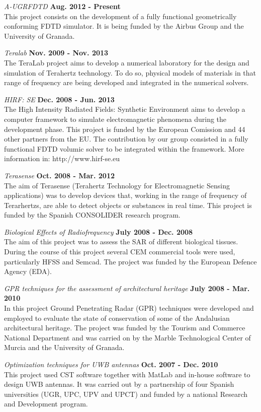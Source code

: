 \documentclass[margin,line]{res}
\begin{document}
\begin{resume}
\begin{minipage}{\textwidth}
  {\em A-UGRFDTD} \hfill {\bf Aug. 2012 - Present}\\
  This project consists on the development of a fully functional geometrically conforming FDTD simulator.
  It is being funded by the Airbus Group and the University of Granada.
\end{minipage}

{\em Teralab} \hfill {\bf Nov. 2009 - Nov. 2013}\\
The TeraLab project aims to develop a numerical laboratory for the design and
simulation of Terahertz technology. To do so, physical models of materials in that
range of frequency are being developed and integrated in the numerical solvers.

{\em HIRF: SE} \hfill {\bf Dec. 2008 - Jun. 2013}\\
The High Intensity Radiated Fields: Synthetic Environment aims to develop a computer framework to simulate electromagnetic phenomena during the development phase. This project is funded by the European Comission and 44 other partners from the EU. The contribution by our group consisted in a fully functional FDTD volumic solver to be integrated within the framework. More information in: http://www.hirf-se.eu

{\em Terasense} \hfill {\bf Oct. 2008 - Mar. 2012}\\
The aim of Terasense (Terahertz Technology for Electromagnetic Sensing
applications) was to develop devices that, working in the range of frequency of
Terarhertzs, are able to detect objects or substances in real time. This project is
funded by the Spanish CONSOLIDER research program.

{\em Biological Effects of Radiofrequency} \hfill {\bf July 2008 - Dec. 2008}\\
The aim of this project was to assess the SAR of different biological tissues. During
the course of this project several CEM commercial tools were used, particularly
HFSS and Semcad. The project was funded by the European Defence Agency (EDA).

\begin{minipage}{\textwidth}
  {\em GPR techniques for the assessment of architectural heritage} \hfill {\bf July 2008 - Mar. 2010}\\
  In this project Ground Penetrating Radar (GPR) techniques were developed and employed to evaluate the state of conservation of some of the Andalusian architectural heritage. The project was funded by the Tourism and Commerce National Department and was carried on by the Marble Technological Center of Murcia and the University of Granada.
\end{minipage}

{\em Optimization techniques for UWB antennas} \hfill {\bf Oct. 2007 - Dec. 2010}\\
This project used CST software together with MatLab and in-house software to design UWB antennas. It was carried out by a partnership of four Spanish universities (UGR, UPC, UPV and UPCT) and funded by a national Research and Development program.

\end{resume}
\end{document}
